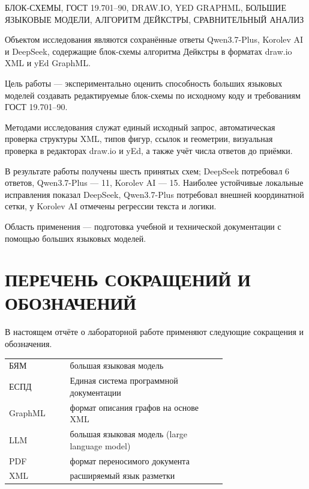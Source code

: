 \documentclass[a4paper,12pt]{extreport}
\begin{document}
{\noindent\raggedright{}\relax
БЛОК-СХЕМЫ, ГОСТ 19.701--90, DRAW.IO, YED GRAPHML, БОЛЬШИЕ ЯЗЫКОВЫЕ МОДЕЛИ, АЛГОРИТМ ДЕЙКСТРЫ, СРАВНИТЕЛЬНЫЙ АНАЛИЗ\par}

Объектом исследования являются сохранённые ответы Qwen3.7-Plus, Korolev AI и DeepSeek, содержащие блок-схемы алгоритма Дейкстры в форматах draw.io XML и yEd GraphML.

Цель работы --- экспериментально оценить способность больших языковых моделей создавать редактируемые блок-схемы по исходному коду и требованиям ГОСТ 19.701--90.

Методами исследования служат единый исходный запрос, автоматическая проверка структуры XML, типов фигур, ссылок и геометрии, визуальная проверка в редакторах draw.io и yEd, а также учёт числа ответов до приёмки.

В результате работы получены шесть принятых схем; DeepSeek потребовал 6 ответов, Qwen3.7-Plus --- 11, Korolev AI --- 15. Наиболее устойчивые локальные исправления показал DeepSeek, Qwen3.7-Plus потребовал внешней координатной сетки, у Korolev AI отмечены регрессии текста и логики.

Область применения --- подготовка учебной и технической документации с помощью больших языковых моделей.

\tableofcontents

\chapter*{ПЕРЕЧЕНЬ СОКРАЩЕНИЙ И ОБОЗНАЧЕНИЙ}

В настоящем отчёте о лабораторной работе применяют следующие сокращения и обозначения.

\noindent
\begin{tabular}{@{}l@{\quad---\quad}p{0.72\linewidth}@{}}
БЯМ & большая языковая модель \\
ЕСПД & Единая система программной документации \\
GraphML & формат описания графов на основе XML \\
LLM & большая языковая модель (large language model) \\
PDF & формат переносимого документа \\
XML & расширяемый язык разметки
\end{tabular}

\begingroup
{}
\end{document}
